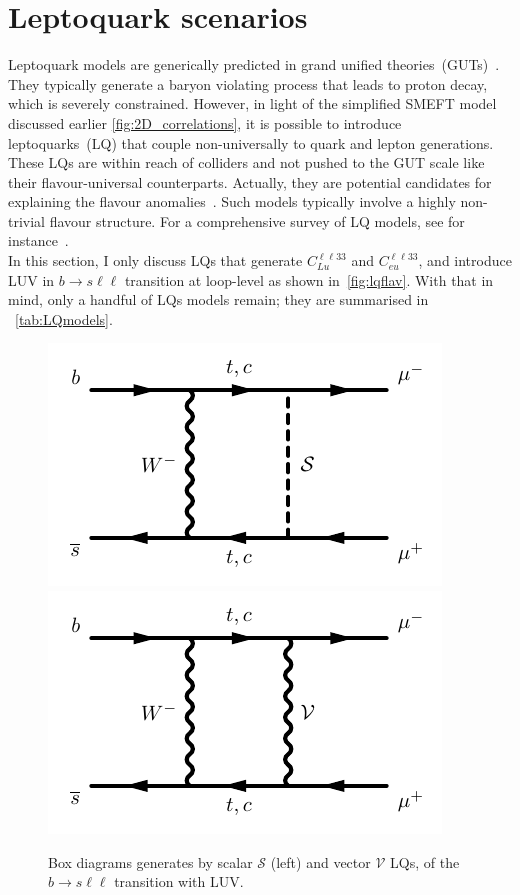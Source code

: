 \section{Leptoquark scenarios}
\label{sec:mod_Leptoquarks}
Leptoquark models are generically predicted in grand unified  theories~(GUTs)~\cite{Pati:1974yy,PhysRevLett.32.438}. They typically generate a baryon violating process that leads to proton decay, which is severely constrained. However, in light of the simplified SMEFT model discussed earlier \autoref{fig:2D_correlations}, it is possible to introduce leptoquarks~(LQ) that couple non-universally to quark and lepton generations.  These LQs are within reach of colliders and not pushed to the GUT scale like their flavour-universal counterparts. Actually, they are potential candidates for explaining the flavour anomalies~\cite{Camargo-Molina:2018cwu,Coy:2019rfr}.  Such models typically involve a highly non-trivial flavour structure.  For a comprehensive survey of LQ models, see for instance~\cite{Buchmuller:1986zs,delAguila:2010mx,Alonso:2015sja,Dorsner:2016wpm,deBlas:2017xtg}. \\
In this section, I only discuss LQs that generate  $C_ {Lu}^{\ell \ell33}$ and $C_{eu}^{\ell \ell33} $, and introduce LUV in $b \to s \ell \ell$ transition at loop-level as shown in~\autoref{fig:lqflav}. With that in mind, only a handful of LQs models remain; they are summarised in ~\autoref{tab:LQmodels}.
\begin{figure}[htpb!]
	\centering 
	\includegraphics[width=0.45\linewidth]{figures/x_bsllSLQ}
	\includegraphics[width=0.45\linewidth]{figures/x_bsllVLQ}
	\caption{Box diagrams generates by scalar $\mathcal S$ (left) and vector $\mathcal V$ LQs, of the $b \to s \ell \ell$ transition with LUV. }    
	\label{fig:lqflav}
\end{figure}
